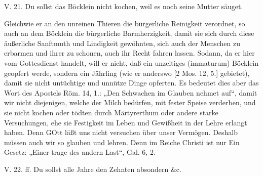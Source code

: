 \begin{schriftzitat}
V. 21. Du sollst das Böcklein nicht kochen, weil es noch seine Mutter säuget.
\end{schriftzitat}

Gleichwie er an den unreinen Thieren die bürgerliche Reinigkeit verordnet, so auch an dem Böcklein die bürgerliche Barmherzigkeit, damit sie sich durch diese äußerliche Sanftmuth und Lindigkeit gewöhnten, sich auch der Menschen zu erbarmen und ihrer zu schonen, auch ihr Recht fahren lassen. Sodann, da er hier vom Gottesdienst handelt, will er nicht, daß ein unzeitiges (immaturum) Böcklein geopfert werde, sondern ein Jährling (wie er anderswo [2 Mos. 12, 5.] gebietet), damit sie nicht untüchtige und unnütze Dinge opferten. Es bedeutet dies aber das Wort des Apostels Röm. 14, 1.: „Den Schwachen im Glauben nehmet auf“, damit wir nicht diejenigen, welche der Milch bedürfen, mit fester Speise verderben, und sie nicht kochen oder tödten durch Märtyrerthum oder andere starke Versuchungen, ehe sie Festigkeit im Leben und Gewißheit in der Lehre erlangt haben. Denn GOtt läßt uns nicht versuchen über unser Vermögen. Deshalb müssen auch wir so glauben und lehren. Denn im Reiche Christi ist nur Ein Gesetz: „Einer trage des andern Last“, Gal. 6, 2.

\begin{schriftzitat}
V. 22. ff. Du sollst alle Jahre den Zehnten absondern \&c.
\end{schriftzitat}

